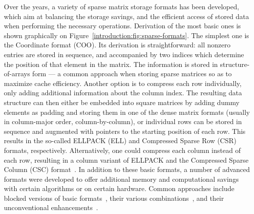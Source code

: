 Over the years, a variety of sparse matrix storage formats has been developed,
which aim at balancing the storage savings, and the efficient access of
stored data when performing the necessary operations. Derivation of the most
basic ones is shown graphically on Figure~\ref{introduction:fig:sparse-formats}.
The simplest one is the Coordinate format (COO). Its derivation is
straightforward: all nonzero entries are stored in sequence, and accompanied by
two indices which determine the position of that element in the matrix. The
information is stored in structure-of-arrays form --- a common approach when
storing sparse matrices so as to maximize cache efficiency. Another option is to
compress each row individually, only adding additional information about the
column index. The resulting data structure can then either be embedded into
square matrices by adding dummy elements as padding and storing them in one of
the dense matrix formats (usually in column-major order, \ie column-by-column),
or individual rows can be stored in sequence and augmented with pointers to the
starting position of each row. This results in the so-called ELLPACK (ELL) and
Compressed Sparse Row (CSR) formats, respectively. Alternatively, one could
compress each column instead of each row, resulting in a column variant of
ELLPACK and the Compressed Sparse Column (CSC) format~\cite{saad}. In addition
to these basic formats, a number of advanced formats were developed to offer
additional memory and computational savings with certain algorithms or on
certain hardware. Common approaches include blocked versions of basic
formats~\cite{csb, bsr}, their various
combinations~\cite{sell-p,sell-c-sigma,bell-garland}, and their unconventional
enhancements~\cite{csr5, ecker}.


